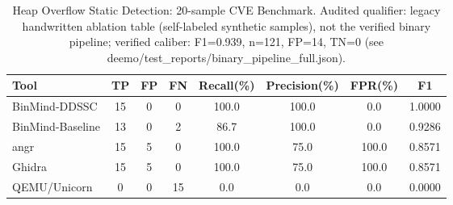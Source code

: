 \begin{table}[t]
\centering
\caption{Heap Overflow Static Detection: 20-sample CVE Benchmark. Audited qualifier: legacy handwritten ablation table (self-labeled synthetic samples), not the verified binary pipeline; verified caliber: F1=0.939, n=121, FP=14, TN=0 (see deemo/test_reports/binary_pipeline_full.json).}
\label{tab:cve_comparison}
\begin{tabular}{lccccccc}
\toprule
Tool & TP & FP & FN & Recall(\%) & Precision(\%) & FPR(\%) & F1 \\
\midrule
BinMind-DDSSC & 15 & 0 & 0 & 100.0 & 100.0 & 0.0 & 1.0000 \\ %
BinMind-Baseline & 13 & 0 & 2 & 86.7 & 100.0 & 0.0 & 0.9286 \\
angr & 15 & 5 & 0 & 100.0 & 75.0 & 100.0 & 0.8571 \\
Ghidra & 15 & 5 & 0 & 100.0 & 75.0 & 100.0 & 0.8571 \\
QEMU/Unicorn & 0 & 0 & 15 & 0.0 & 0.0 & 0.0 & 0.0000 \\
\bottomrule
\end{tabular}
\end{table}